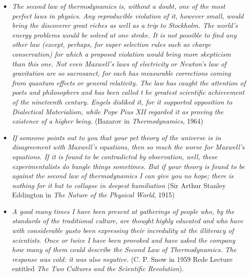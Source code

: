 \begin{itemize}
{a prime example to 
show that physicists are not exempt from the madness
of crowds...\\
Clausius' verbal statement of the second law makes 
no sense...All that remains is a Mosaic prohibition; 
a century of philosophers and journalists have acclaimed this 
commandment; a century of mathematicians have shuddered and
averted their eyes from the unclean...Seven times in the past thirty 
years have I tried to follow the argument Clausius
offers and seven times has it blanked and gravelled me. I cannot
explain what I cannot understand}. (Truesdell \cite{truesdell})
\item \emph{The second law of thermodynamics is, without a doubt, one of 
the most perfect laws in physics. Any reproducible violation of it, however 
small, would bring the discoverer great riches as well as a trip to Stockholm. 
The world's energy problems would be solved at one stroke. It is not 
possible to find any other law (except, perhaps, for super selection rules 
such as charge conservation) for which a proposed violation would bring more 
skepticism than this one. Not even Maxwell's laws of electricity or 
Newton's law of gravitation are so sacrosanct, for each has measurable 
corrections coming from quantum effects or general relativity. The law 
has caught the attention of poets and philosophers and has been called t
he greatest scientific achievement of the nineteenth century. Engels 
disliked it, for it supported opposition to Dialectical Materialism, 
while Pope Pius XII regarded it as proving the existence of a higher being.}
(Bazarov in \emph{Thermodynamics}, 1964)

\item \emph{If someone points out to you that your pet theory of the universe is in 
disagreement with Maxwell's equations, then so much the worse for 
Maxwell's equations. If it is found to be contradicted by observation, well, 
these experimentalists do bungle things sometimes. But if your theory 
is found to be against the second law of thermodynamics I can give you 
no hope; there is nothing for it but to collapse in deepest humiliation}
(Sir Arthur Stanley Eddington in \emph{The Nature of the Physical 
World}, 1915)
\item \emph{A good many times I have been present at gatherings of people who, 
by the standards of the traditional culture, are thought highly educated 
and who have with considerable gusto been expressing their incredulity at 
the illiteracy of scientists. Once or twice I have been provoked and have 
asked the company how many of them could describe the Second Law of 
Thermodynamics. The response was cold: it was also negative.}
(C. P. Snow in 1959 Rede Lecture entitled 
\emph{The Two Cultures and the Scientific Revolution}).
\end{itemize}



